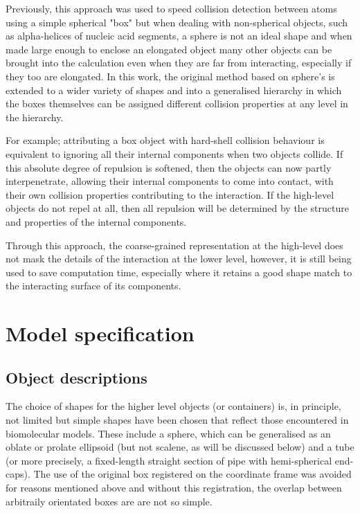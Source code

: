 Previously, this approach was used to speed collision detection
between atoms using a simple spherical "box" but when dealing with non-spherical objects,
such as alpha-helices of nucleic acid segments, a sphere is not an ideal shape and
when made large enough to enclose an elongated object many other objects can be
brought into the calculation even when they are far from interacting, especially if
they too are elongated.   In this work, the original method based on sphere's is
extended to a wider variety of shapes and into a generalised hierarchy in which the
boxes themselves can be assigned different collision properties at any level in the
hierarchy. 

For example; attributing a box object with hard-shell collision behaviour is equivalent to
ignoring all their internal components when two objects collide.    If this absolute
degree of repulsion is softened, then the objects can now partly interpenetrate,
allowing their internal components to come into contact, with their own collision
properties contributing to the interaction.   If the high-level objects do not
repel at all, then all repulsion will be determined by the structure and properties of
the internal components.

Through this approach, the coarse-grained representation at the high-level does not
mask the details of the interaction at the lower level, however, it is still being
used to save computation time, especially where it retains a good shape match to the
interacting surface of its components.


\section{Model specification}

\subsection{Object descriptions}
 
The choice of shapes for the higher level objects (or containers) is, in principle, not
limited but simple shapes have been chosen that reflect those encountered in biomolecular
models.   These include a sphere, which can be generalised as an oblate or prolate ellipsoid
(but not scalene, as will be discussed below) and a tube (or more precisely, a fixed-length
straight section of pipe with hemi-spherical end-caps).   The use of the original box
registered on the coordinate frame was avoided for reasons mentioned above and without
this registration, the overlap between arbitraily orientated boxes are are not so simple.

